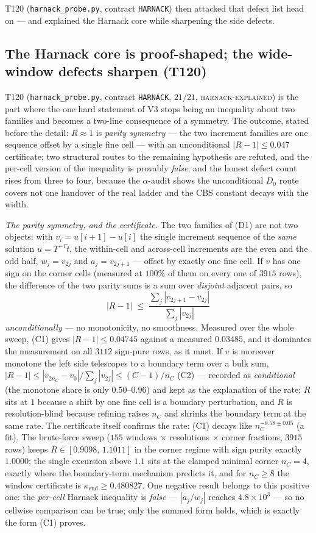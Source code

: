 \documentclass[11pt,a4paper]{article}
\begin{document}
\noindent T120 (\texttt{harnack\_probe.py}, contract \texttt{HARNACK}) then attacked that
defect list head on --- and explained the Harnack core while sharpening the side defects.

\subsection{The Harnack core is proof-shaped; the wide-window defects sharpen (T120)}
T120 (\texttt{harnack\_probe.py}, contract \texttt{HARNACK}, $21/21$,
\textsc{harnack-explained}) is the part where the one hard statement of V3 stops being an
inequality about two families and becomes a two-line consequence of a symmetry. The outcome,
stated before the detail: $R\approx1$ is \emph{parity symmetry} --- the two increment families
are one sequence offset by a single fine cell --- with an unconditional $|R-1|\le0.047$
certificate; two structural routes to the remaining hypothesis are refuted, and the per-cell
version of the inequality is provably \emph{false}; and the honest defect count rises from
three to four, because the $\alpha$-audit shows the unconditional $D_0$ route covers not one
handover of the real ladder and the CBS constant decays with the width.

\emph{The parity symmetry, and the certificate.} The two families of (D1) are not two objects:
with $v_i=u[i+1]-u[i]$ the single increment sequence of the \emph{same} solution
$u=T^{-1}\tilde t$, the within-cell and across-cell increments are the even and the odd half,
$w_j=v_{2j}$ and $a_j=v_{2j+1}$ --- offset by exactly one fine cell. If $v$ has one sign on the
corner cells (measured at $100\%$ of them on every one of $3915$ rows), the difference of the
two parity sums is a sum over \emph{disjoint} adjacent pairs, so
\[
|R-1|\;\le\;\frac{\sum_j|v_{2j+1}-v_{2j}|}{\sum_j|v_{2j}|}
\tag{C1}
\]
\emph{unconditionally} --- no monotonicity, no smoothness. Measured over the whole sweep, (C1)
gives $|R-1|\le0.04745$ against a measured $0.03485$, and it dominates the measurement on all
$3112$ sign-pure rows, as it must. If $v$ is moreover monotone the left side telescopes to a
boundary term over a bulk sum, $|R-1|\le|v_{2n_C}-v_0|/\sum_j|v_{2j}|\le(C-1)/n_C$ (C2) ---
recorded as \emph{conditional} (the monotone share is only $0.50$--$0.96$) and kept as the
explanation of the rate: $R$ sits at $1$ because a shift by one fine cell is a boundary
perturbation, and $R$ is resolution-blind because refining raises $n_C$ and shrinks the
boundary term at the same rate. The certificate itself confirms the rate: (C1) decays like
$n_C^{-0.58\pm0.05}$ (a fit). The brute-force sweep ($155$ windows $\times$ resolutions
$\times$ corner fractions, $3915$ rows) keeps $R\in[0.9098,\,1.1011]$ in the corner regime
with sign purity exactly $1.0000$; the single excursion above $1.1$ sits at the clamped
minimal corner $n_C=4$, exactly where the boundary-term mechanism predicts it, and for
$n_C\ge8$ the window certificate is $\kappa_{\mathrm{end}}\ge0.480827$. One negative result
belongs to this positive one: the \emph{per-cell} Harnack inequality is \emph{false} ---
$|a_j/w_j|$ reaches $4.8\times10^{3}$ --- so no cellwise comparison can be true; only the
summed form holds, which is exactly the form (C1) proves.
\end{document}

